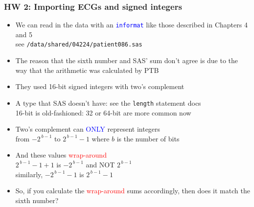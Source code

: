 \documentclass[11pt,pdftex,dvipsnames,usenames,helvetica]{beamer}
\begin{document}
\begin{frame}[fragile]
\frametitle{HW 2: Importing ECGs and signed integers}
\begin{itemize}
\item We can read in the data with an \textcolor{blue}{\tt informat}
  like those described in Chapters 4 and 5\\
see {\tt /data/shared/04224/patient086.sas}
\item The reason that the sixth number and SAS' sum don't agree
is due to the way that the arithmetic was calculated by PTB
\item They used 16-bit signed integers with two's complement\\
\item A type that SAS doesn't have: see the {\tt length} statement docs\\
16-bit is old-fashioned: 32 or 64-bit are more common now
\item Two's complement can \textcolor{blue}{ONLY} represent integers\\
 from $-2^{\,b-1}$ to $2^{\,b-1}-1$ where $b$ is the number of bits
\item And these values \textcolor{red}{wrap-around}\\ 
$2^{\,b-1}-1+1$ is $-2^{\,b-1}$ and NOT $2^{\,b-1}$\\
similarly, $-2^{\,b-1}-1$ is $2^{\,b-1}-1$ \\
\item So, if you calculate the \textcolor{red}{wrap-around}
sums accordingly, then does it match the sixth number?
\end{itemize}
\end{frame}
\end{document}
